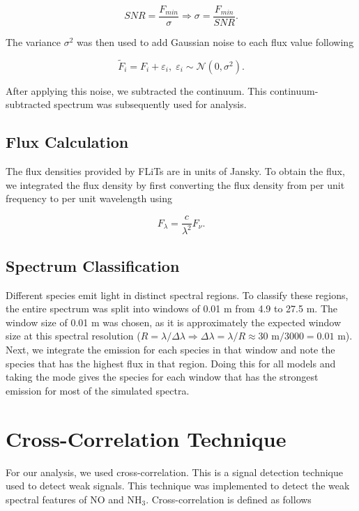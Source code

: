 \documentclass[oneside, single, authoryear, semicolon, 12pt]{lion-msc}
\newcommand{\4}{$_4$}
\newcommand{\3}{$_3$}
\newcommand{\2}{$_2$}
\begin{document}
\begin{equation}
    SNR = \frac{F_{min}}{\sigma}\Rightarrow\sigma=\frac{F_{min}}{SNR}.
    \label{eq: SNR}
\end{equation}

The variance $\sigma^2$ was then used to add Gaussian noise to each flux value following 

\begin{equation}
    \tilde{F}_i = F_i + \varepsilon_i,\;\varepsilon_i\sim\mathcal{N}(0, \sigma^2).
    \label{eq: noise}
\end{equation}

After applying this noise, we subtracted the continuum. This continuum-subtracted spectrum was subsequently used for analysis.

\subsection{Flux Calculation}
The flux densities provided by FLiTs are in units of Jansky. To obtain the flux, we integrated the flux density by first converting the flux density from per unit frequency to per unit wavelength using

\begin{equation}
    F_\lambda=\frac{c}{\lambda^2}F_\nu.
    \label{eq: conversion}
\end{equation}

\subsection{Spectrum Classification}
Different species emit light in distinct spectral regions. To classify these regions, the entire spectrum was split into windows of 0.01 \textmu m from 4.9 to 27.5 \textmu m. The window size of 0.01 \textmu m was chosen, as it is approximately the expected window size at this spectral resolution ($R=\lambda/\Delta\lambda\Rightarrow\Delta\lambda=\lambda/R\approx30 $ \textmu$\mathrm{m}/3000=0.01$ \textmu$\mathrm{m}$). Next, we integrate the emission for each species in that window and note the species that has the highest flux in that region. Doing this for all models and taking the mode gives the species for each window that has the strongest emission for most of the simulated spectra.  


\section{Cross-Correlation Technique}
For our analysis, we used cross-correlation. This is a signal detection technique used to detect weak signals. This technique was implemented to detect the weak spectral features of NO and NH\3. Cross-correlation is defined as follows 
\end{document}
